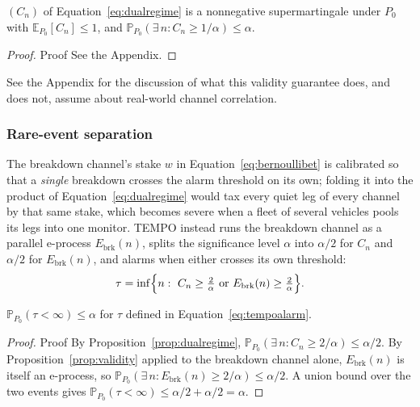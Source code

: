\documentclass[trsc,dblanonrev]{informs4}
\newcommand{\E}{\mathbb{E}}
\newcommand{\Prob}{\mathbb{P}}
\begin{document}
\begin{proposition}\label{prop:dualregime}
$(C_n)$ of Equation~\eqref{eq:dualregime} is a nonnegative
supermartingale under $P_0$ with $\E_{P_0}[C_n] \le 1$, and
$\Prob_{P_0}(\exists\, n : C_n \ge 1/\alpha) \le \alpha$.
\end{proposition}

\begin{proof}{Proof}
See the Appendix.
\end{proof}

\begin{remark}\label{rem:independence}
See the Appendix for the discussion of what this validity
guarantee does, and does not, assume about real-world channel
correlation.
\end{remark}





\subsubsection{Rare-event separation}

The breakdown channel's stake $w$ in Equation~\eqref{eq:bernoullibet}
is calibrated so that a \emph{single} breakdown crosses the alarm
threshold on its own; folding it into the product of
Equation~\eqref{eq:dualregime} would tax every quiet leg of every
channel by that same stake, which becomes severe when a fleet of
several vehicles pools its legs into one monitor. TEMPO instead runs
the breakdown channel as a parallel e-process $E_{\mathrm{brk}}(n)$,
splits the significance level $\alpha$ into $\alpha/2$ for $C_n$ and
$\alpha/2$ for $E_{\mathrm{brk}}(n)$, and alarms when either crosses its
own threshold:
\begin{equation}\label{eq:tempoalarm}
\tau = \inf\Bigl\{n :\ C_n \ge \tfrac{2}{\alpha} \ \text{or}\
E_{\mathrm{brk}}(n) \ge \tfrac{2}{\alpha}\Bigr\}.
\end{equation}

\begin{proposition}\label{prop:split}
$\Prob_{P_0}(\tau < \infty) \le \alpha$ for $\tau$ defined in
Equation~\eqref{eq:tempoalarm}.
\end{proposition}

\begin{proof}{Proof}
By Proposition~\ref{prop:dualregime}, $\Prob_{P_0}(\exists\, n : C_n
\ge 2/\alpha) \le \alpha/2$. By Proposition~\ref{prop:validity} applied
to the breakdown channel alone, $E_{\mathrm{brk}}(n)$ is itself an
e-process, so $\Prob_{P_0}(\exists\, n : E_{\mathrm{brk}}(n) \ge
2/\alpha) \le \alpha/2$. A union bound over the two events gives
$\Prob_{P_0}(\tau < \infty) \le \alpha/2 + \alpha/2 = \alpha$. \Halmos
\end{proof}
\end{document}
